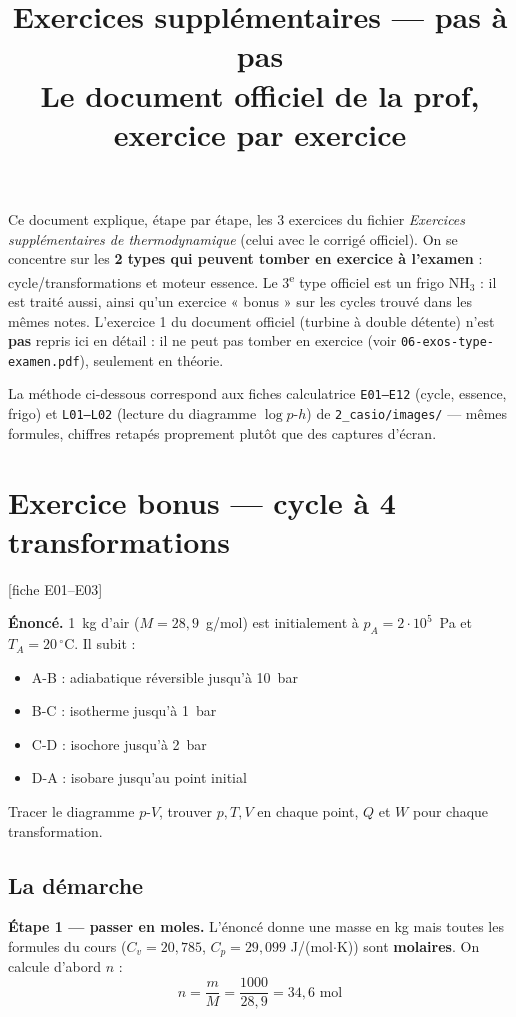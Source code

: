 \documentclass[11pt,a4paper]{article}
\title{\textbf{Exercices supplémentaires --- pas à pas}\\[3pt]
\large Le document officiel de la prof, exercice par exercice}
\author{}
\date{}
\newcommand{\fiche}[1]{\hfill{\small\color{cgris}[fiche #1]}}
\begin{document}
\maketitle
\vspace{-0.9cm}

\begin{info}
Ce document explique, étape par étape, les 3 exercices du fichier
\textit{Exercices supplémentaires de thermodynamique} (celui avec le corrigé officiel).
On se concentre sur les \textbf{2 types qui peuvent tomber en exercice à l'examen} :
cycle/transformations et moteur essence. Le 3\textsuperscript{e} type officiel est un
frigo NH$_3$ : il est traité aussi, ainsi qu'un exercice « bonus » sur les cycles trouvé
dans les mêmes notes. L'exercice 1 du document officiel (turbine à double détente) n'est
\textbf{pas} repris ici en détail : il ne peut pas tomber en exercice (voir
\texttt{06-exos-type-examen.pdf}), seulement en théorie.

\smallskip
La méthode ci-dessous correspond aux fiches calculatrice \texttt{E01--E12} (cycle, essence,
frigo) et \texttt{L01--L02} (lecture du diagramme $\log p$-$h$) de \texttt{2\_casio/images/} ---
mêmes formules, chiffres retapés proprement plutôt que des captures d'écran.
\end{info}

\tableofcontents
\newpage

\section{Exercice bonus --- cycle à 4 transformations}
\fiche{E01--E03}

\begin{enonce}
\textbf{Énoncé.} 1~kg d'air ($M=28{,}9$~g/mol) est initialement à $p_A=2\cdot10^5$~Pa et
$T_A=20\,^\circ$C. Il subit :
\begin{itemize}[nosep,leftmargin=1.4em]
\item A-B : adiabatique réversible jusqu'à 10~bar
\item B-C : isotherme jusqu'à 1~bar
\item C-D : isochore jusqu'à 2~bar
\item D-A : isobare jusqu'au point initial
\end{itemize}
Tracer le diagramme $p$-$V$, trouver $p,T,V$ en chaque point, $Q$ et $W$ pour chaque
transformation.
\end{enonce}

\subsection*{La démarche}
\begin{etape}
\textbf{Étape 1 --- passer en moles.} L'énoncé donne une masse en kg mais toutes les
formules du cours ($C_v=20{,}785$, $C_p=29{,}099$ J/(mol$\cdot$K)) sont \textbf{molaires}.
On calcule d'abord $n$ :
\[ n=\frac{m}{M}=\frac{1000}{28{,}9}=34{,}6\text{ mol} \]
\end{etape}
\end{document}

